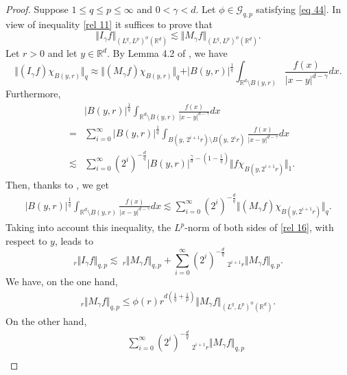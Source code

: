 \documentclass[10pt,a4paper]{amsart}
\numberwithin{equation}{section}
\numberwithin{equation}{section}
\begin{document}
\begin{proof}
Suppose $1\leq  q \leq p \leq \infty$ and $0<\gamma< d$. Let $\phi \in \mathcal{G}_{q,p}$ satisfying \eqref{eq 44}. In view of inequality \eqref{rel 11} it suffices to prove that $$\Vert I_{\gamma}f \Vert_{(L^{q},L^{p})^{\phi}(\mathbb{R}^{d})}  \lesssim   \Vert M_{\gamma}f \Vert_{(L^{q},L^{p})^{\phi}(\mathbb{R}^{d})}.$$
Let $r>0$ and let $y \in \mathbb{R}^{d}$. By Lemma 4.2 of \cite{GoM}, we have
\begin{equation}\label{rel 16}
 \Vert (I_{\gamma}f) \chi_{B(y,r)} \Vert_{q} \approx \Vert (M_{\gamma}f) \chi_{B(y,r)} \Vert_{q} + \vert B(y,r) \vert^{\frac{1}{q}} \int_{\mathbb{R}^{d}\setminus B(y,r)}\frac{f(x)}{\left|x-y\right|^{d-\gamma}}dx.
\end{equation}
Furthermore,
\begin{eqnarray*}
& & \vert B(y,r) \vert^{\frac{1}{q}} \int_{\mathbb{R}^{d}\setminus B(y,r)}\frac{f(x)}{\left|x-y\right|^{d-\gamma}}dx \\
 &=&  \sum\limits^{\infty}_{i=0} \vert B(y,r) \vert^{\frac{1}{q}}  \displaystyle\int_{ B(y,\, 2^{i+1}r)\setminus B(y,\, 2^{i}r) } \frac{f(x)}{\left|x-y\right|^{d-\gamma}} dx\\ &\lesssim&  \sum\limits^{\infty}_{i=0} (2^{i})^{-\frac{d}{q}}\vert B(y,r) \vert^{\frac{\gamma}{d}-(1-\frac{1}{q})}  \Vert f \chi_{B(y,2^{i+1}r)} \Vert_{1}.
\end{eqnarray*}
Then, thanks to \cite[Theorem 5.2]{GoM}, we get
\begin{eqnarray*}
\vert B(y,r) \vert^{\frac{1}{q}} \int_{\mathbb{R}^{d}\setminus B(y,r)}\frac{f(x)}{\left|x-y\right|^{d-\gamma}}dx \lesssim  \sum\limits^{\infty}_{i=0} (2^{i})^{-\frac{d}{q}}  \Vert (M_{\gamma}f) \chi_{B(y,2^{i+1}r)} \Vert_{q}.
\end{eqnarray*}
Taking into
account this inequality, the $ L^{p}$-norm of both sides of \eqref{rel 16}, with respect to $y$, leads to
$$_{r}\Vert I_{\gamma}f \Vert_{q,p} \lesssim \: _{r}\Vert M_{\gamma}f \Vert_{q,p} +  \sum\limits^{\infty}_{i=0} (2^{i})^{-\frac{d}{q}}  \: _{2^{i+1}r}\Vert M_{\gamma}f \Vert_{q,p}.  $$
We have, on the one hand,
\begin{eqnarray} \label{eq 5}
_{r}\Vert M_{\gamma}f \Vert_{q,p} \leq \phi(r)r^{d(\frac{1}{q}+\frac{1}{p})}\Vert M_{\gamma}f \Vert_{(L^{q},L^{p})^{\phi}(\mathbb{R}^{d})}.
\end{eqnarray}
On the other hand,
\begin{eqnarray*}
& &\sum\limits^{\infty}_{i=0} (2^{i})^{-\frac{d}{q}}  \: _{2^{i+1}r}\Vert M_{\gamma}f \Vert_{q,p}\\

\end{eqnarray*}
\end{proof}
\end{document}
